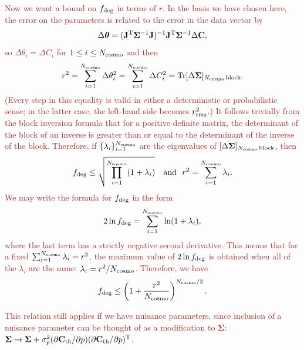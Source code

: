 \documentclass[usenatbib]{mnras}
\newcommand{\changetext}[1]{\textcolor{brown}{#1}}
\begin{document}
\changetext{Now we want a bound on $f_{\rm deg}$ in terms of $r$. In the basis we have chosen here, the error on the parameters is related to the error in the data vector by
\begin{equation}
\Delta{\boldsymbol\theta} = ({\bf J}^{\rm T}{\boldsymbol\Sigma}^{-1}{\bf J})^{-1} {\bf J}^{\rm T}{\boldsymbol\Sigma}^{-1}\Delta{\bf C},
\end{equation}
so $\Delta\theta_i = \Delta C_i$ for $1\le i\le N_{\rm cosmo}$ and then
\begin{equation}
r^2 = \sum_{i=1}^{N_{\rm cosmo}} \Delta\theta_i^2 = \sum_{i=1}^{N_{\rm cosmo}} \Delta C_i^2
= {\rm Tr} [\Delta{\boldsymbol\Sigma}]_{N_{\rm cosmo}\,\rm block}.
\end{equation}
(Every step in this equality is valid in either a deterministic or probabilistic sense; in the latter case, the left-hand side becomes $r_{\rm rms}^2$.)
It follows trivially from the block inversion formula that for a positive definite matrix, the determinant of the block of an inverse is greater than or equal to the determinant of the inverse of the block. Therefore, if $\{\lambda_i\}_{i=1}^{N_{\rm cosmo}}$ are the eigenvalues of $[\Delta{\boldsymbol\Sigma}]_{N_{\rm cosmo}\,\rm block}$, then
\begin{equation}
f_{\rm deg} \le \sqrt{ \prod_{i=1}^{N_{\rm cosmo}} (1+\lambda_i)}
~~~{\rm and} ~~
r^2 = \sum_{i=1}^{N_{\rm cosmo}} \lambda_i.
\end{equation}
We may write the formula for $f_{\rm deg}$ in the form
\begin{equation}
2\ln f_{\rm deg} = \sum_{i=1}^{N_{\rm cosmo}} \ln (1+\lambda_i),
\end{equation}
where the last term has a strictly negative second derivative. This means that for a fixed $\sum_{i=1}^{N_{\rm cosmo}} \lambda_i = r^2$, the maximum value of $2\ln f_{\rm deg}$ is obtained when all of the $\lambda_i$ are the same: $\lambda_i = r^2/{N_{\rm cosmo}}$. Therefore, we have
\begin{equation}
f_{\rm deg} \le \left( 1 + \frac{r^2}{N_{\rm cosmo}} \right)^{N_{\rm cosmo}/2}.
\label{eq:fdeg-ineq}
\end{equation}
}

\changetext{This relation still applies if we have nuisance parameters, since inclusion of a nuisance parameter can be thought of as a modification to ${\boldsymbol\Sigma}$: ${\boldsymbol\Sigma} \rightarrow {\boldsymbol\Sigma} + \sigma_p^2 (\partial{\bf C}_{\rm th}/\partial p)(\partial{\bf C}_{\rm th}/\partial p)^{\rm T}$.}
\end{document}
